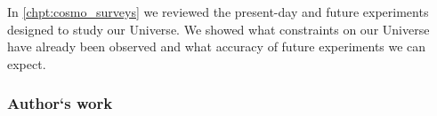 In \autoref{chpt:cosmo_surveys} we reviewed the present-day and future experiments designed to study our Universe. We showed what constraints on our Universe have already been observed and what accuracy of future experiments we can expect.

\subsubsection{Author`s work}

